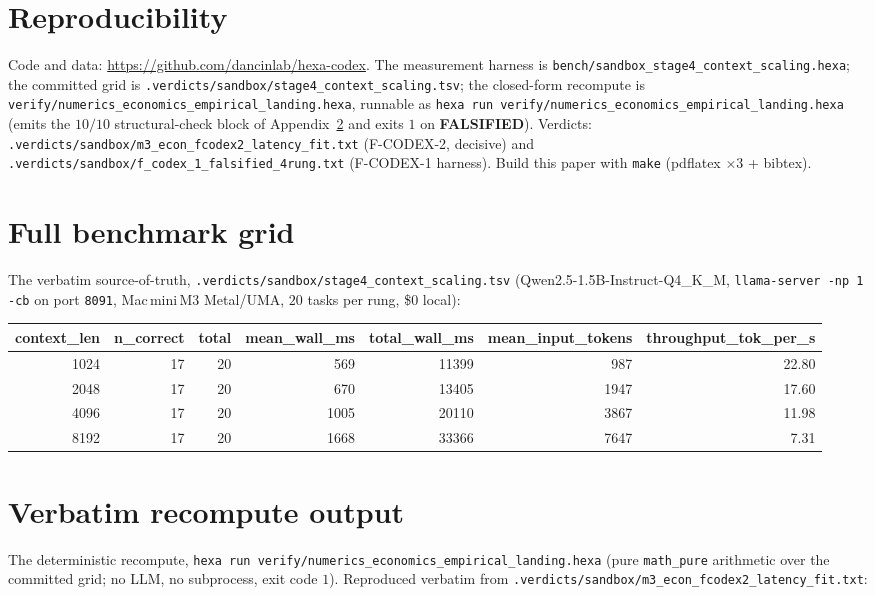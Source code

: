 \documentclass[11pt,a4paper]{article}
\newcommand{\red}[1]{\textcolor{red!70!black}{\textbf{#1}}}
\begin{document}
\section*{Reproducibility}

Code and data: \url{https://github.com/dancinlab/hexa-codex}. The measurement
harness is \texttt{bench/sandbox\_stage4\_context\_scaling.hexa}; the committed
grid is \texttt{.verdicts/sandbox/stage4\_context\_scaling.tsv}; the closed-form
recompute is \texttt{verify/numerics\_economics\_empirical\_landing.hexa},
runnable as \texttt{hexa run
verify/numerics\_economics\_empirical\_landing.hexa} (emits the \(10/10\)
structural-check block of Appendix~\ref{app:verify} and exits \(1\) on
\red{FALSIFIED}). Verdicts:
\texttt{.verdicts/sandbox/m3\_econ\_fcodex2\_latency\_fit.txt} (F-CODEX-2,
decisive) and \texttt{.verdicts/sandbox/f\_codex\_1\_falsified\_4rung.txt}
(F-CODEX-1 harness). Build this paper with \texttt{make} (pdflatex \(\times 3\)
+ bibtex).

\appendix
\section{Full benchmark grid}
\label{app:grid}
The verbatim source-of-truth, \texttt{.verdicts/sandbox/stage4\_context\_scaling.tsv}
(Qwen2.5-1.5B-Instruct-Q4\_K\_M, \texttt{llama-server -np 1 -cb} on port
\texttt{8091}, Mac\,mini\,M3 Metal/UMA, \(20\) tasks per rung, \$0 local):

\begin{center}
\small
\begin{tabular}{rrrrrrr}
\toprule
context\_len & n\_correct & total & mean\_wall\_ms & total\_wall\_ms & mean\_input\_tokens & throughput\_tok\_per\_s \\
\midrule
1024 & 17 & 20 & 569  & 11399 & 987  & 22.80 \\
2048 & 17 & 20 & 670  & 13405 & 1947 & 17.60 \\
4096 & 17 & 20 & 1005 & 20110 & 3867 & 11.98 \\
8192 & 17 & 20 & 1668 & 33366 & 7647 & 7.31 \\
\bottomrule
\end{tabular}
\end{center}

\section{Verbatim recompute output}
\label{app:verify}
The deterministic recompute, \texttt{hexa run
verify/numerics\_economics\_empirical\_landing.hexa} (pure
\texttt{math\_pure} arithmetic over the committed grid; no LLM, no subprocess,
exit code \(1\)). Reproduced verbatim from
\texttt{.verdicts/sandbox/m3\_econ\_fcodex2\_latency\_fit.txt}:
\end{document}
